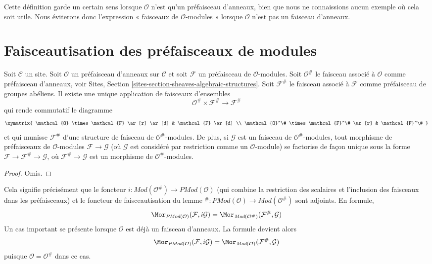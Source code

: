 \noindent
Cette définition garde un certain sens lorsque $\mathcal{O}$ n'est qu'un
préfaisceau d'anneaux, bien que nous ne connaissions aucun exemple où cela soit
utile. Nous éviterons donc l'expression « faisceaux de $\mathcal{O}$-modules »
lorsque $\mathcal{O}$ n'est pas un faisceau d'anneaux.



\section{Faisceautisation des préfaisceaux de modules}
\label{section-sheafification-presheaves-modules}

\begin{lemma}
\label{lemma-sheafification-presheaf-modules}
Soit $\mathcal{C}$ un site. Soit $\mathcal{O}$ un préfaisceau d'anneaux sur
$\mathcal{C}$ et soit $\mathcal{F}$ un préfaisceau de $\mathcal{O}$-modules.
Soit $\mathcal{O}^\#$ le faisceau associé à $\mathcal{O}$ comme préfaisceau
d'anneaux, voir Sites, Section
\ref{sites-section-sheaves-algebraic-structures}. Soit $\mathcal{F}^\#$ le
faisceau associé à $\mathcal{F}$ comme préfaisceau de groupes abéliens. Il
existe une unique application de faisceaux d'ensembles
$$
\mathcal{O}^\# \times \mathcal{F}^\#
\longrightarrow
\mathcal{F}^\#
$$
qui rende commutatif le diagramme
$$
\xymatrix{
\mathcal{O} \times \mathcal{F} \ar[r] \ar[d] &
\mathcal{F} \ar[d] \\
\mathcal{O}^\# \times \mathcal{F}^\# \ar[r] &
\mathcal{F}^\#
}
$$
et qui munisse $\mathcal{F}^\#$ d'une structure de faisceau de
$\mathcal{O}^\#$-modules. De plus, si $\mathcal{G}$ est un faisceau de
$\mathcal{O}^\#$-modules, tout morphisme de préfaisceaux de
$\mathcal{O}$-modules $\mathcal{F} \to \mathcal{G}$ (où $\mathcal{G}$ est
considéré par restriction comme un $\mathcal{O}$-module) se factorise de façon
unique sous la forme $\mathcal{F} \to \mathcal{F}^\# \to \mathcal{G}$, où
$\mathcal{F}^\# \to \mathcal{G}$ est un morphisme de
$\mathcal{O}^\#$-modules.
\end{lemma}

\begin{proof}
Omis.
\end{proof}

\noindent
Cela signifie précisément que le foncteur
$i : \textit{Mod}(\mathcal{O}^\#) \to \textit{PMod}(\mathcal{O})$
(qui combine la restriction des scalaires et l'inclusion des faisceaux dans
les préfaisceaux) et le foncteur de faisceautisation du lemme
${}^\# : \textit{PMod}(\mathcal{O}) \to \textit{Mod}(\mathcal{O}^\#)$
sont adjoints. En formule,
$$
\Mor_{\textit{PMod}(\mathcal{O})}(\mathcal{F}, i\mathcal{G})
=
\Mor_{\textit{Mod}(\mathcal{O}^\#)}(\mathcal{F}^\#, \mathcal{G})
$$
Un cas important se présente lorsque $\mathcal{O}$ est déjà un faisceau
d'anneaux. La formule devient alors
$$
\Mor_{\textit{PMod}(\mathcal{O})}(\mathcal{F}, i\mathcal{G})
=
\Mor_{\textit{Mod}(\mathcal{O})}(\mathcal{F}^\#, \mathcal{G})
$$
puisque $\mathcal{O} = \mathcal{O}^\#$ dans ce cas.


